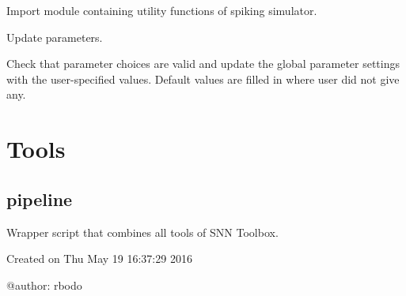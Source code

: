 \documentclass[letterpaper,10pt,english]{sphinxmanual}
\begin{document}
\begin{fulllineitems}
\label{configure_toolbox:snntoolbox.config.initialize_simulator}
Import module containing utility functions of spiking simulator.

\end{fulllineitems}


\begin{fulllineitems}
\label{configure_toolbox:snntoolbox.config.update_setup}
Update parameters.

Check that parameter choices  are valid and update the global
parameter settings  with the user-specified
values. Default values are filled in where user did not give any.

\end{fulllineitems}



\section{Tools}
\label{modules:tools}\label{modules::doc}

\subsection{pipeline}
\label{core:pipeline}\label{core::doc}\label{core:module-core.pipeline}
Wrapper script that combines all tools of SNN Toolbox.

Created on Thu May 19 16:37:29 2016

@author: rbodo

\begin{fulllineitems}
\label{core:core.pipeline.is_stop}
\end{fulllineitems}

\end{document}
